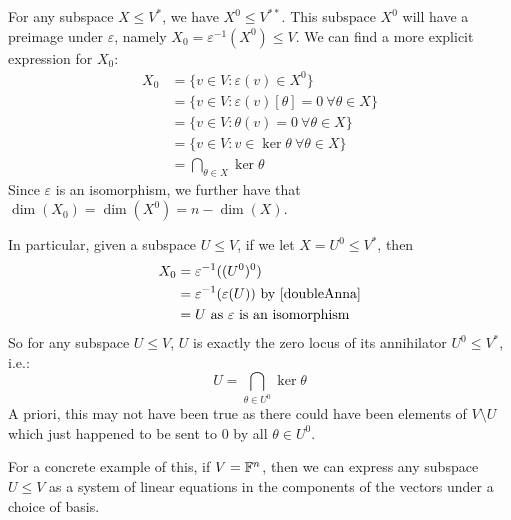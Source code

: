 \documentclass[../main.tex]{subfiles}
\begin{document}
\begin{remark}
  For any subspace $X \leq V^{*}$, we have $X^{0} \leq V^{**}$.
  This subspace $X^{0}$ will have a preimage under $\varepsilon$, namely $X_0 = \varepsilon^{-1}(X^{0}) \leq V$.
  We can find a more explicit expression for $X_0$:
  \begin{align*}
    X_0 &= \{v \in V: \varepsilon(v) \in X^{0}\} \\
        &= \{v \in V: \varepsilon(v)[\theta] = 0\ \forall \theta \in X\} \\
        &= \{v \in V: \theta(v) = 0\ \forall \theta \in X\} \\
        &= \{v \in V: v \in \ker \theta\ \forall \theta \in X\} \\
        &= \bigcap_{\theta \in X} \ker \theta
  \end{align*}
  Since $\varepsilon$ is an isomorphism, we further have that $\dim(X_0) = \dim(X^{0}) = n - \dim(X)$.

  In particular, given a subspace $U \leq V$, if we let $X = U^{0} \leq V^{*}$, then
  \begin{align*}
    X_0 &= \varepsilon^{-1}((U^{0})^{0}) \\
        &= \varepsilon^{-1}(\varepsilon(U)) \text{ by \cref{doubleAnna}} \\
        &= U \text{ as $\varepsilon$ is an isomorphism}
  \end{align*}
  So for any subspace $U \leq V$, $U$ is exactly the zero locus of its annihilator $U^{0} \leq V^{*}$, i.e.:
  \[
    U = \bigcap_{\theta \in U^{0}} \ker \theta
  \]
  A priori, this may not have been true as there could have been elements of $V \setminus U$ which just happened to be sent to $0$ by all $\theta \in U^{0}$.

  For a concrete example of this, if $V = \mathbb{F}^n$, then we can express any subspace $U \leq V$ as a system of linear equations in the components of the vectors under a choice of basis.
\end{remark}
\end{document}
